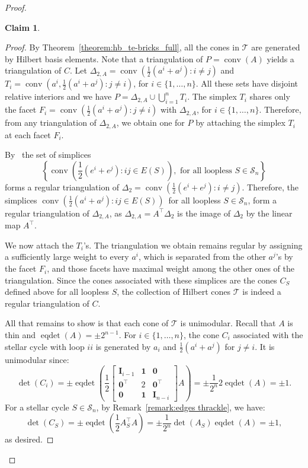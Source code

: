 \documentclass[11pt,a4paper]{amsart}
\theoremstyle{plain}
\newtheorem{claim}[theorem]{Claim}
\theoremstyle{definition}
\newcommand{\cal}[1]{\mathcal{#1}}
\DeclareMathOperator{\conv}{conv}
\DeclareMathOperator{\eqdet}{eqdet}
\renewcommand{\cal}[1]{\mathcal{#1}}
\begin{document}
\begin{proof}
\begin{claim}
\end{claim}
\begin{proof}
By Theorem~\ref{theorem:hb_te-bricks_full}, all the cones in $\cal T$ are generated by Hilbert basis elements.
Note that a triangulation of $P=\conv (A)$ yields a triangulation of $C$.
Let $\Delta_{2,A}=\conv\left(\frac{1}{2}(a^i+a^j)\colon i\neq j\right)$ and $T_i=\conv \left(a^i,\frac{1}{2}(a^i+a^j)\colon j\neq i\right)$, for $i\in\{1,\ldots,n\}$.
All these sets have disjoint relative interiors and we have $P=\Delta_{2,A}\cup\bigcup_{i=1}^n T_i$.
The simplex $T_i$ shares only the facet $F_i=\conv(\frac{1}{2}(a^i+a^j)\colon j\neq i)$ with $\Delta_{2,A}$, for $i\in\{1,\ldots,n\}$.
Therefore, from any triangulation of $\Delta_{2,A}$, we obtain one for $P$ by attaching the simplex $T_i$ at each facet $F_i$.

By~\cite[{Theorem~2.3 and Lemma~2.4}]{DeLoera_Sturmfels_Thomas_1995} the set of simplices
$$\left\{\conv \left(\frac{1}{2}(e^i+e^j)\colon ij\in E(S)\right)\!\!, \text{ for all loopless } S\in\cal S_n\right\}$$
forms a regular triangulation of $\Delta_2=\conv\left(\frac{1}{2}(e^i+e^j)\colon i\neq j\right)$.
Therefore, the simplices $\conv \left(\frac{1}{2}(a^i+a^j):ij\in E(S)\right)$~for all loopless $S\in\cal S_n$, form a regular triangulation of $\Delta_{2,A}$, as $\Delta_{2,A} = A^\top\Delta_{2}$ is the image of $\Delta_2$ by the linear map $A^\top$.

We now attach the $T_i$'s. The triangulation we obtain remains regular by assigning a sufficiently large weight to every $a^i$, which is separated from the other $a^j$'s by the facet $F_i$, and those facets have maximal weight among the other ones of the triangulation.
Since the cones associated with these simplices are the cones $C_S$ defined above for all loopless $S$, the collection of Hilbert cones $\cal T$ is indeed a regular triangulation of $C$.
\medskip


All that remains to show is that each cone of $\cal T$ is unimodular.
Recall that $A$ is thin and $\eqdet (A) =\pm 2^{n-1}$.
For $i\in\{1,\ldots,n\}$, the cone $C_i$ associated with the stellar cycle with loop $ii$ is generated by $a_i$ and $\frac{1}{2}(a^i+a^j)$ for $j\neq i$.
It is unimodular since:
$$\det (C_i) = \pm\eqdet \left(\frac{1}{2}\begin{bmatrix}
	\mathbf{I}_{i-1} & \mathbf{1} & \mathbf{0}\\
	\mathbf{0}^\top & 2 & \mathbf{0}^\top\\
	\mathbf{0} & \mathbf{1} & \mathbf{I}_{n-i}
\end{bmatrix}A \right) = \pm  \frac{1}{2^n} 2\eqdet (A)= \pm1.$$
\medskip
For a stellar cycle $S\in\cal S_n$, by Remark~\ref{remark:edges thrackle}, we have:
$$\det (C_S) = \pm\eqdet \left(\frac{1}{2} A_S^\top A \right) = \pm \frac{1}{2^n} \det (A_S) \eqdet (A) = \pm1,$$
as desired.
\end{proof}

\end{proof}
\end{document}
